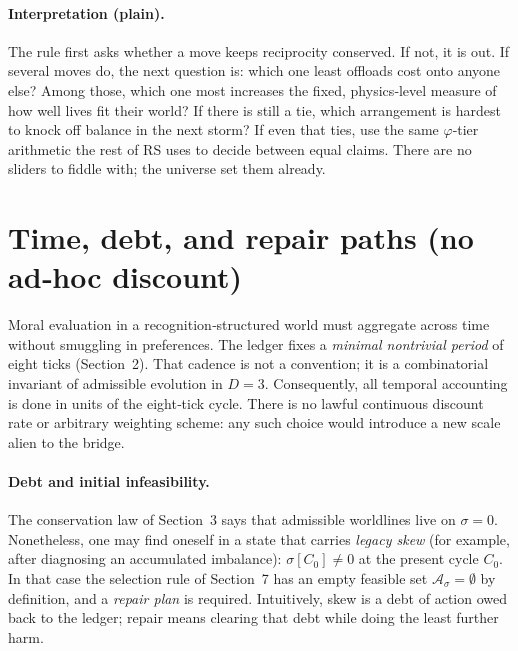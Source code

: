 \documentclass[11pt]{article}
\begin{document}
\paragraph{Interpretation (plain).}
The rule first asks whether a move keeps reciprocity conserved. If not, it is out. If several moves do, the next question is: which one least offloads cost onto anyone else? Among those, which one most increases the fixed, physics‑level measure of how well lives fit their world? If there is still a tie, which arrangement is hardest to knock off balance in the next storm? If even that ties, use the same $\varphi$‑tier arithmetic the rest of RS uses to decide between equal claims. There are no sliders to fiddle with; the universe set them already.

\section{Time, debt, and repair paths (no ad‑hoc discount)}

Moral evaluation in a recognition‑structured world must aggregate across time without smuggling in preferences. The ledger fixes a \emph{minimal nontrivial period} of eight ticks (Section~2). That cadence is not a convention; it is a combinatorial invariant of admissible evolution in $D=3$. Consequently, all temporal accounting is done in units of the eight‑tick cycle. There is no lawful continuous discount rate or arbitrary weighting scheme: any such choice would introduce a new scale alien to the bridge.

\paragraph{Debt and initial infeasibility.}
The conservation law of Section~3 says that admissible worldlines live on $\sigma=0$. Nonetheless, one may find oneself in a state that carries \emph{legacy skew} (for example, after diagnosing an accumulated imbalance): $\sigma[C_0]\neq 0$ at the present cycle $C_0$. In that case the selection rule of Section~7 has an empty feasible set $\mathcal{A}_\sigma=\emptyset$ by definition, and a \emph{repair plan} is required. Intuitively, skew is a debt of action owed back to the ledger; repair means clearing that debt while doing the least further harm.
\end{document}
